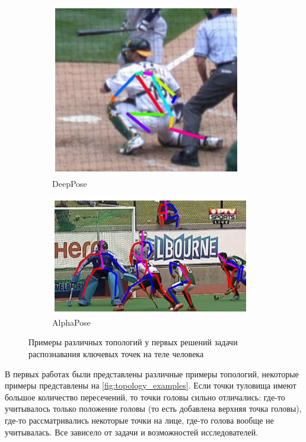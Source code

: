 \begin{figure}[h]
\begin{subfigure}[b]{.3\textwidth}
	\includegraphics[width=\textwidth]{./images/deeppose_topology.png}
	\caption{DeepPose \cite{DeepPose}}
\end{subfigure}
\begin{subfigure}[b]{.455\textwidth}
	\centering
	\includegraphics[width=\textwidth]{./images/alphapose_topology.png}
	\caption{AlphaPose \cite{AlphaPose}}
\end{subfigure}
\caption{Примеры различных топологий у первых решений задачи распознавания ключевых точек на теле человека}
\label{fig:topology_examples}
\end{figure}

В первых работах были представлены различные примеры топологий, некоторые примеры представлены на \autoref{fig:topology_examples}. Если точки туловища имеют большое количество пересечений, то точки головы сильно отличались: где-то учитывалось только положение головы (то есть добавлена верхняя точка головы), где-то рассматривались некоторые точки на лице, где-то голова вообще не учитывалась. Все зависело от задачи и возможностей исследователей.


